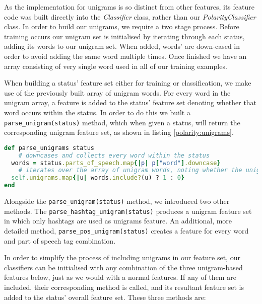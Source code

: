 As the implementation for unigrams is so distinct from other features, its feature code was built directly into the \emph{Classifier} class, rather than our \emph{PolarityClassifier} class. In order to build our unigrams, we require a two stage process. Before training occurs our unigram set is initialised by iterating through each status, adding its words to our unigram set.  When added, words' are down-cased in order to avoid adding the same word multiple times. Once finished we have an array consisting of very single word used in all of our training examples.

When building a status' feature set either for training or classification, we make use of the previously built array of unigram words. For every word in the unigram array, a feature is added to the status' feature set denoting whether that word occurs within the status. In order to do this we built a \texttt{parse\_unigram(status)} method, which when given a status, will return the corresponding unigram feature set, as shown in listing \ref{polarity:unigrams}.

\begin{lstlisting}[language=Ruby, caption={Example feature set}, label=polarity:unigrams]
def parse_unigrams status
	# downcases and collects every word within the status
  words = status.parts_of_speech.map{|p| p["word"].downcase}
	# iterates over the array of unigram words, noting whether the unigram exists within our status' set of words 
  self.unigrams.map{|u| words.include?(u) ? 1 : 0}
end
\end{lstlisting}

Alongside the \texttt{parse\-\_unigram\-(status)} method, we introduced two other methods. The \texttt{parse\-\_hashtag\-\_unigram\-(status)} produces a unigram feature set in which only hashtags are used as unigrams feature. An additional, more detailed method, \texttt{parse\-\_pos\-\_unigram\-(status)} creates a feature for every word and part of speech tag combination.

In order to simplify the process of including unigrams in our feature set, our classifiers can be initialised with any combination of the three unigram-based features below, just as we would with a normal features. If any of them are included, their corresponding method is called, and its resultant feature set is added to the status' overall feature set. These three methods are:

